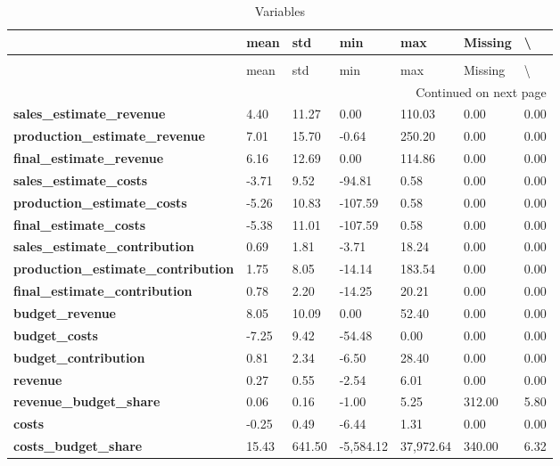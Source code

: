 \begin{landscape}\begin{longtable}{lllllll}
\caption{Variables} \label{eda_1} \\
\toprule
 & mean & std & min & max & Missing & \textbackslash \\%
\midrule
\endfirsthead
\caption[]{Variables} \\
\toprule
 & mean & std & min & max & Missing & \textbackslash \\%
\midrule
\endhead
\midrule
\multicolumn{7}{r}{Continued on next page} \\
\midrule
\endfoot
\bottomrule
\endlastfoot
\textbf{sales\_estimate\_revenue} & 4.40 & 11.27 & 0.00 & 110.03 & 0.00 & 0.00 \\
\textbf{production\_estimate\_revenue} & 7.01 & 15.70 & -0.64 & 250.20 & 0.00 & 0.00 \\
\textbf{final\_estimate\_revenue} & 6.16 & 12.69 & 0.00 & 114.86 & 0.00 & 0.00 \\
\textbf{sales\_estimate\_costs} & -3.71 & 9.52 & -94.81 & 0.58 & 0.00 & 0.00 \\
\textbf{production\_estimate\_costs} & -5.26 & 10.83 & -107.59 & 0.58 & 0.00 & 0.00 \\
\textbf{final\_estimate\_costs} & -5.38 & 11.01 & -107.59 & 0.58 & 0.00 & 0.00 \\
\textbf{sales\_estimate\_contribution} & 0.69 & 1.81 & -3.71 & 18.24 & 0.00 & 0.00 \\
\textbf{production\_estimate\_contribution} & 1.75 & 8.05 & -14.14 & 183.54 & 0.00 & 0.00 \\
\textbf{final\_estimate\_contribution} & 0.78 & 2.20 & -14.25 & 20.21 & 0.00 & 0.00 \\
\textbf{budget\_revenue} & 8.05 & 10.09 & 0.00 & 52.40 & 0.00 & 0.00 \\
\textbf{budget\_costs} & -7.25 & 9.42 & -54.48 & 0.00 & 0.00 & 0.00 \\
\textbf{budget\_contribution} & 0.81 & 2.34 & -6.50 & 28.40 & 0.00 & 0.00 \\
\textbf{revenue} & 0.27 & 0.55 & -2.54 & 6.01 & 0.00 & 0.00 \\
\textbf{revenue\_budget\_share} & 0.06 & 0.16 & -1.00 & 5.25 & 312.00 & 5.80 \\
\textbf{costs} & -0.25 & 0.49 & -6.44 & 1.31 & 0.00 & 0.00 \\
\textbf{costs\_budget\_share} & 15.43 & 641.50 & -5,584.12 & 37,972.64 & 340.00 & 6.32 \\

\end{longtable}
\end{landscape}
